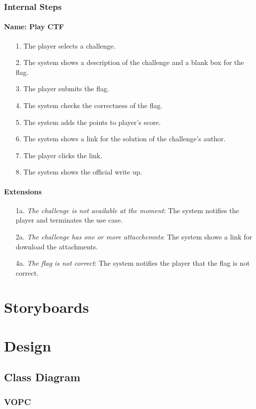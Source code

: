 \documentclass[12pt]{article}
\begin{document}
\subsubsection{Internal Steps}
\paragraph{Name: Play CTF}
\begin{itemize}
\item[1.] The player selects a challenge.
\item[2.] The system shows a description of the challenge and a blank box for the flag.
\item[3.] The player submits the flag.
\item[4.] The system checks the correctness of the flag.
\item[5.] The system adds the points to player's score.
\item[6.] The system shows a link for the solution of the challenge's author.
\item[7.] The player clicks the link.
\item[8.] The system shows the official write up.
\end{itemize}
\paragraph{Extensions}
\begin{itemize}
\item [1a.] \textit{The challenge is not available at the moment}: The system notifies the player and terminates the use case.
\item [2a.] \textit{The challenge has one or more attacchemnts}: The system shows a link for download the attachments.
\item [4a.] \textit{The flag is not correct}: The system notifies the player that the flag is not correct.
\end{itemize}
\section{Storyboards}
\section{Design}
\subsection{Class Diagram}
\subsubsection{VOPC}
\end{document}
